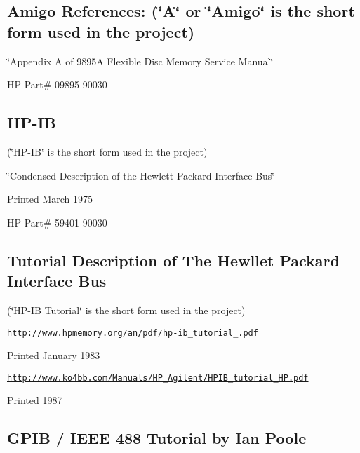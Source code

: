\subsection*{Amigo References\-: (\char`\"{}\-A\char`\"{} or \char`\"{}\-Amigo\char`\"{} is the short form used in the project)}


\begin{DoxyItemize}
\item \char`\"{}\-Appendix A of 9895\-A Flexible Disc Memory Service Manual\char`\"{}
\item H\-P Part\# 09895-\/90030
\end{DoxyItemize}

\subsection*{H\-P-\/\-I\-B}


\begin{DoxyItemize}
\item (\char`\"{}\-H\-P-\/\-I\-B\char`\"{} is the short form used in the project)
\item \char`\"{}\-Condensed Description of the Hewlett Packard Interface Bus\char`\"{}
\item Printed March 1975
\item H\-P Part\# 59401-\/90030
\end{DoxyItemize}

\subsection*{Tutorial Description of The Hewllet Packard Interface Bus}


\begin{DoxyItemize}
\item (\char`\"{}\-H\-P-\/\-I\-B Tutorial\char`\"{} is the short form used in the project)
\item \href{http://www.hpmemory.org/an/pdf/hp-ib_tutorial_1980.pdf}{\tt http\-://www.\-hpmemory.\-org/an/pdf/hp-\/ib\-\_\-tutorial\-\_.\-pdf}
\item Printed January 1983
\item \href{http://www.ko4bb.com/Manuals/HP_Agilent/HPIB_tutorial_HP.pdf}{\tt http\-://www.\-ko4bb.\-com/\-Manuals/\-H\-P\-\_\-\-Agilent/\-H\-P\-I\-B\-\_\-tutorial\-\_\-\-H\-P.\-pdf}
\item Printed 1987
\end{DoxyItemize}

\subsection*{G\-P\-I\-B / I\-E\-E\-E 488 Tutorial by Ian Poole}



